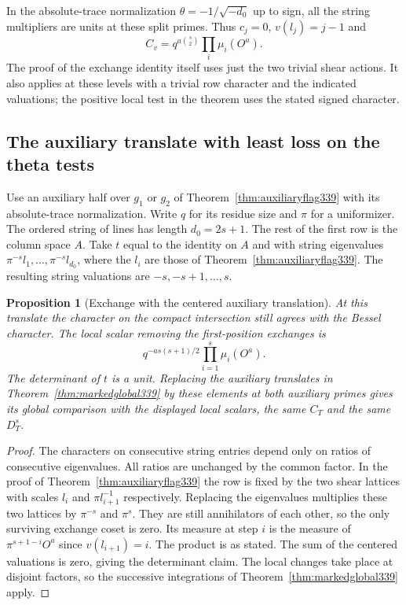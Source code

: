 \documentclass[a4paper,11pt]{article}
\newtheorem{proposition}{Proposition}[section]
\theoremstyle{definition}
\theoremstyle{remark}
\numberwithin{equation}{section}
\begin{document}
In the absolute-trace normalization \(\theta=-1/\sqrt{-d_0}\)
up to sign, all the string multipliers are units at these split
primes. Thus \(c_j=0\), \(v(l_j)=j-1\) and
\[
                 C_v=q^{a\binom{s}{2}}\prod_i\mu_i(O^a).
\]
The proof of the exchange identity itself uses just the two
trivial shear actions. It also applies at these levels with a
trivial row character and the indicated valuations; the positive
local test in the theorem uses the stated signed character.


\subsection{The auxiliary translate with least loss on the theta tests}\label{sec:centeredflag341}
Use an auxiliary half over $g_1$ or $g_2$ of
Theorem~\ref{thm:auxiliaryflag339} with its absolute-trace
normalization. Write $q$ for its residue size and $\pi$ for a
uniformizer. The ordered string of lines has length $d_0=2s+1$.
The rest of the first row is the column space $A$. Take $t$ equal
to the identity on $A$ and with string eigenvalues
$\pi^{-s}l_1,\ldots,\pi^{-s}l_{d_0}$, where the $l_i$ are those
of Theorem~\ref{thm:auxiliaryflag339}. The resulting string
valuations are $-s,-s+1,\ldots,s$.

\begin{proposition}[Exchange with the centered auxiliary translation]\leavevmode\label{prop:centeredflag341}
At this translate the character on the compact intersection still
agrees with the Bessel character. The local scalar removing the
first-position exchanges is
\[
                   q^{-a s(s+1)/2}\prod_{i=1}^{s}\mu_i(O^a).
\]
The determinant of $t$ is a unit. Replacing the auxiliary translates
in Theorem~\ref{thm:markedglobal339} by these elements at both
auxiliary primes gives its global comparison with the displayed
local scalars, the same $C_T$ and the same $D_T^s$.
\end{proposition}
\begin{proof}
The characters on consecutive string entries depend only on ratios
of consecutive eigenvalues. All ratios are unchanged by the common
factor. In the proof of Theorem~\ref{thm:auxiliaryflag339} the row
is fixed by the two shear lattices with scales $l_i$ and
$\pi l_{i+1}^{-1}$ respectively. Replacing the eigenvalues multiplies
these two lattices by $\pi^{-s}$ and $\pi^s$. They are still
annihilators of each other, so the only surviving exchange coset is
zero. Its measure at step $i$ is the measure of
$\pi^{s+1-i}O^a$ since $v(l_{i+1})=i$. The product is as stated.
The sum of the centered valuations is zero, giving the determinant
claim. The local changes take place at disjoint factors, so the
successive integrations of Theorem~\ref{thm:markedglobal339} apply.
\end{proof}
\end{document}
